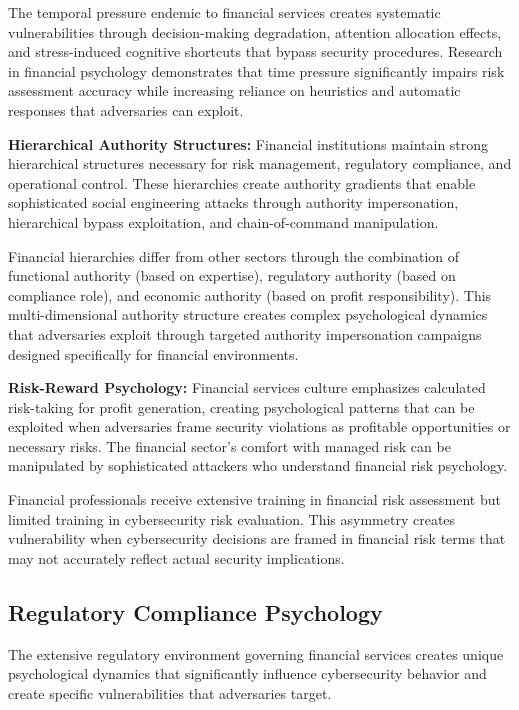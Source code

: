 \documentclass[10pt, twocolumn]{article}
\begin{document}
The temporal pressure endemic to financial services creates systematic vulnerabilities through decision-making degradation, attention allocation effects, and stress-induced cognitive shortcuts that bypass security procedures. Research in financial psychology demonstrates that time pressure significantly impairs risk assessment accuracy while increasing reliance on heuristics and automatic responses that adversaries can exploit\cite{kahneman2011}.

\textbf{Hierarchical Authority Structures:} Financial institutions maintain strong hierarchical structures necessary for risk management, regulatory compliance, and operational control. These hierarchies create authority gradients that enable sophisticated social engineering attacks through authority impersonation, hierarchical bypass exploitation, and chain-of-command manipulation.

Financial hierarchies differ from other sectors through the combination of functional authority (based on expertise), regulatory authority (based on compliance role), and economic authority (based on profit responsibility). This multi-dimensional authority structure creates complex psychological dynamics that adversaries exploit through targeted authority impersonation campaigns designed specifically for financial environments.

\textbf{Risk-Reward Psychology:} Financial services culture emphasizes calculated risk-taking for profit generation, creating psychological patterns that can be exploited when adversaries frame security violations as profitable opportunities or necessary risks. The financial sector's comfort with managed risk can be manipulated by sophisticated attackers who understand financial risk psychology.

Financial professionals receive extensive training in financial risk assessment but limited training in cybersecurity risk evaluation. This asymmetry creates vulnerability when cybersecurity decisions are framed in financial risk terms that may not accurately reflect actual security implications.

\subsection{Regulatory Compliance Psychology}

The extensive regulatory environment governing financial services creates unique psychological dynamics that significantly influence cybersecurity behavior and create specific vulnerabilities that adversaries target.
\end{document}
